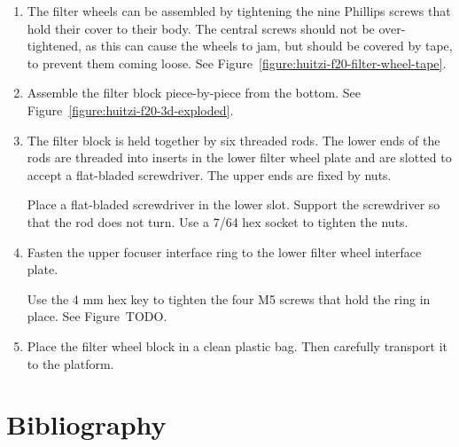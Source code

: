 \begin{enumerate}

 \item The filter wheels can be assembled by tightening the nine Phillips screws that hold their cover to their body. The central screws should not be over-tightened, as this can cause the wheels to jam, but should be covered by tape, to prevent them coming loose. See Figure~\ref{figure:huitzi-f20-filter-wheel-tape}.
 
  \item Assemble the filter block piece-by-piece from the bottom. See Figure~\ref{figure:huitzi-f20-3d-exploded}.

  \item The filter block is held together by six threaded rods. The lower ends of the rods are threaded into inserts in the lower filter wheel plate and are slotted to accept a flat-bladed screwdriver. The upper ends are fixed by nuts.
  
  Place a flat-bladed screwdriver in the lower slot. Support the screwdriver so that the rod does not turn. Use a 7/64 hex socket to tighten the nuts.
  
   \item Fasten the upper focuser interface ring to the lower filter wheel interface plate. 
   
   Use the 4 mm hex key to tighten the four M5 screws that hold the ring in place. See Figure~TODO.
   
   \item Place the filter wheel block in a clean plastic bag. Then carefully transport it to the platform.
  
\end{enumerate}


\section{Bibliography}

